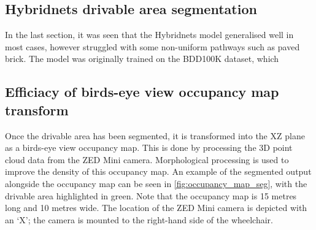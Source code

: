 \subsection{Hybridnets drivable area segmentation}
In the last section, it was seen that the Hybridnets model generalised well in most cases,
however struggled with some non-uniform pathways such as paved brick.
The model was originally trained on the BDD100K dataset, which 

\pagebreak
\subsection{Efficiacy of birds-eye view occupancy map transform}
Once the drivable area has been segmented, it is transformed into the XZ plane
as a birds-eye view occupancy map. This is done by processing the 3D point cloud
data from the ZED Mini camera.
Morphological processing is used to improve the density of this occupancy map.
An example of the segmented output alongside the occupancy map can be seen in \cref{fig:occupancy_map_seg},
with the drivable area highlighted in green.
Note that the occupancy map is 15 metres long and 10 metres wide. The location of the ZED Mini camera is depicted
with an `X'; the camera is mounted to the right-hand side of the wheelchair.

